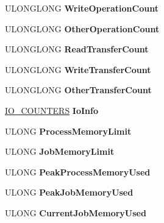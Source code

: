 \begin{DoxyCompactItemize}
\item 
\mbox{\label{struct___e_j_o_b_aa4ffa45915dc3fc738d7d67c6e826abe}} 
U\+L\+O\+N\+G\+L\+O\+NG {\bfseries Write\+Operation\+Count}
\item 
\mbox{\label{struct___e_j_o_b_a433c269c6750bb1ed90b6a175a753f79}} 
U\+L\+O\+N\+G\+L\+O\+NG {\bfseries Other\+Operation\+Count}
\item 
\mbox{\label{struct___e_j_o_b_a615f7d92e8dc0cbac455835daa1fe1f0}} 
U\+L\+O\+N\+G\+L\+O\+NG {\bfseries Read\+Transfer\+Count}
\item 
\mbox{\label{struct___e_j_o_b_ad5e1bbf36d3eca757af4319ccd323481}} 
U\+L\+O\+N\+G\+L\+O\+NG {\bfseries Write\+Transfer\+Count}
\item 
\mbox{\label{struct___e_j_o_b_a0568c13033b948e76f9e8a32cc302348}} 
U\+L\+O\+N\+G\+L\+O\+NG {\bfseries Other\+Transfer\+Count}
\item 
\mbox{\label{struct___e_j_o_b_a95e4f6af407150de1c96f29534a75131}} 
\hyperlink{struct___i_o___c_o_u_n_t_e_r_s}{I\+O\+\_\+\+C\+O\+U\+N\+T\+E\+RS} {\bfseries Io\+Info}
\item 
\mbox{\label{struct___e_j_o_b_a5fd590758515b0aac6a7717c501a5571}} 
U\+L\+O\+NG {\bfseries Process\+Memory\+Limit}
\item 
\mbox{\label{struct___e_j_o_b_acafc535144ce7d3004ea7ee2e449c0f5}} 
U\+L\+O\+NG {\bfseries Job\+Memory\+Limit}
\item 
\mbox{\label{struct___e_j_o_b_a5e23f40e3791ae2c4b1e4eb0704ec83a}} 
U\+L\+O\+NG {\bfseries Peak\+Process\+Memory\+Used}
\item 
\mbox{\label{struct___e_j_o_b_a7de12f591911adbf8e37cb82269e7dd2}} 
U\+L\+O\+NG {\bfseries Peak\+Job\+Memory\+Used}
\item 
\mbox{\label{struct___e_j_o_b_a0e09eabdeb7e3671b6488ed33a23a278}} 
U\+L\+O\+NG {\bfseries Current\+Job\+Memory\+Used}
\item 

\end{DoxyCompactItemize}
